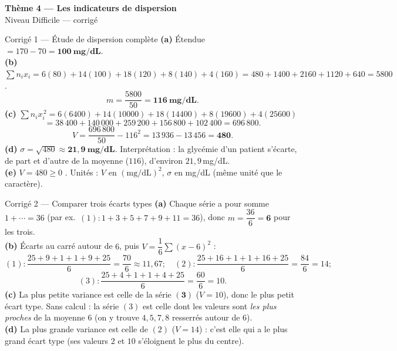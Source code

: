 \documentclass[11pt,a4paper]{article}
\newcommand{\bandeau}[2]{%
\begin{tcolorbox}[boxbase,colback=primary,colframe=primarydark,halign=center,
   before skip=2pt,after skip=12pt]
{\LARGE\bfseries\color{white} #1}\\[3pt]{\normalsize\color{white} #2}
\end{tcolorbox}}
\newcommand{\ect}{\sigma}
\begin{document}
\bandeau{Thème 4 — Les indicateurs de dispersion}{Niveau Difficile — corrigé}

\begin{corbox}{Corrigé 1 — Étude de dispersion complète}
\textbf{(a)} Étendue $=170-70=\mathbf{100\ \text{mg/dL}}$.\\[2pt]
\textbf{(b)} $\sum n_i x_i=6(80)+14(100)+18(120)+8(140)+4(160)=480+1400+2160+1120+640=5800$.
\[ m=\frac{5800}{50}=\mathbf{116\ \text{mg/dL}}. \]
\textbf{(c)} $\sum n_i x_i^{\,2}=6(6400)+14(10000)+18(14400)+8(19600)+4(25600)$
\[ =38\,400+140\,000+259\,200+156\,800+102\,400=696\,800. \]
\[ V=\frac{696\,800}{50}-116^2=13\,936-13\,456=\mathbf{480}. \]
\textbf{(d)} $\ect=\sqrt{480}\approx\mathbf{21{,}9\ \text{mg/dL}}$. Interprétation : la glycémie d'un patient
s'écarte, de part et d'autre de la moyenne ($116$), d'environ $21{,}9$\,mg/dL.\\[2pt]
\textbf{(e)} $V=480\geqslant0$ \checkmark. Unités : $V$ en $(\text{mg/dL})^2$, $\ect$ en mg/dL
(même unité que le caractère).
\end{corbox}

\begin{corbox}{Corrigé 2 — Comparer trois écarts types}
\textbf{(a)} Chaque série a pour somme $1+\cdots=36$ (par ex.\ $(1):1+3+5+7+9+11=36$), donc
$m=\dfrac{36}{6}=\mathbf{6}$ pour les trois.\\[2pt]
\textbf{(b)} Écarts au carré autour de $6$, puis $V=\dfrac{1}{6}\sum(x-6)^2$ :
\[
(1):\frac{25+9+1+1+9+25}{6}=\frac{70}{6}\approx11{,}67;\quad
(2):\frac{25+16+1+1+16+25}{6}=\frac{84}{6}=14;
\]
\[
(3):\frac{25+4+1+1+4+25}{6}=\frac{60}{6}=10.
\]
\textbf{(c)} La plus petite variance est celle de la série $\mathbf{(3)}$ ($V=10$), donc le plus petit
écart type. Sans calcul : la série $(3)$ est celle dont les valeurs sont \emph{les plus proches} de
la moyenne $6$ (on y trouve $4,5,7,8$ resserrés autour de $6$).\\[2pt]
\textbf{(d)} La plus grande variance est celle de $(2)$ ($V=14$) : c'est elle qui a le plus grand
écart type (ses valeurs $2$ et $10$ s'éloignent le plus du centre).
\end{corbox}
\end{document}
